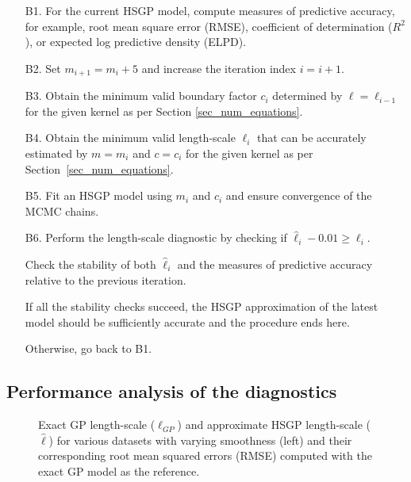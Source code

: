 \begin{enumerate}

\item[B1.] For the current HSGP model, compute measures of predictive accuracy, for example, root mean square error (RMSE), coefficient of determination ($R^2$), or expected log predictive density (ELPD).

\item[B2.] Set $m_{i+1} = m_{i} + 5$ and increase the iteration index $i = i + 1$.

\item[B3.] Obtain the minimum valid boundary factor $c_i$ determined by $\ell = \hat{\ell}_{i-1}$ for the given kernel as per Section \ref{sec_num_equations}.

\item[B4.] Obtain the minimum valid length-scale $\ell_i$ that can be accurately estimated by $m = m_i$ and $c = c_i$ for the given kernel as per Section~\ref{sec_num_equations}.

\item[B5.] Fit an HSGP model using $m_i$ and $c_i$ and ensure convergence of the MCMC chains.

\item[B6.] Perform the length-scale diagnostic by checking if $\hat{\ell}_i - 0.01 \geq \ell_i$. 

Check the stability of both $\hat{\ell}_i$ and the measures of predictive accuracy relative to the previous iteration.

If all the stability checks succeed, the HSGP approximation of the latest model should be sufficiently accurate and the procedure ends here.

Otherwise, go back to B1.
\end{enumerate}

\subsection{Performance analysis of the diagnostics}

\begin{figure}
\centering
{}
\caption{Exact GP length-scale ($\ell_{GP}$) and approximate HSGP length-scale ($\hat{\ell}$) for various datasets with varying smoothness (left) and their corresponding root mean squared errors (RMSE) computed with the exact GP model as the reference.}
  \label{fig7_lscale_comparison}
\end{figure}

